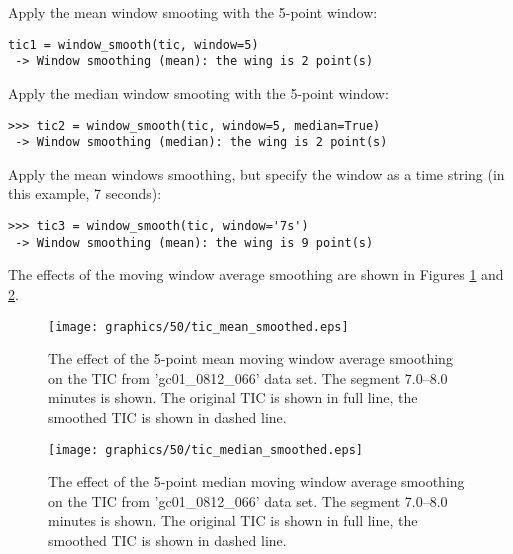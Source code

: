 Apply the mean window smooting with the 5-point window:

\begin{verbatim}
tic1 = window_smooth(tic, window=5)
 -> Window smoothing (mean): the wing is 2 point(s)
\end{verbatim}

Apply the median window smooting with the 5-point window:

\begin{verbatim}
>>> tic2 = window_smooth(tic, window=5, median=True)
 -> Window smoothing (median): the wing is 2 point(s)
\end{verbatim}

Apply the mean windows smoothing, but specify the window as
a time string (in this example, 7 seconds):

\begin{verbatim}
>>> tic3 = window_smooth(tic, window='7s')
 -> Window smoothing (mean): the wing is 9 point(s)
\end{verbatim}

The effects of the moving window average smoothing are shown in Figures
\ref{fig:smoothed-mean} and \ref{fig:smoothed-median}.

\begin{figure}[htp]
\begin{center}
\texttt{[image: graphics/50/tic\_mean\_smoothed.eps]}
\caption{The effect of the 5-point mean moving window average smoothing
on the TIC from 'gc01\_0812\_066' data set. The segment 7.0--8.0
minutes is shown. The original TIC is shown in full line, the smoothed
TIC is shown in dashed line.}
\label{fig:smoothed-mean}
\end{center}
\end{figure}

\begin{figure}[htp]
\begin{center}
\texttt{[image: graphics/50/tic\_median\_smoothed.eps]}
\caption{The effect of the 5-point median moving window average smoothing
on the TIC from 'gc01\_0812\_066' data set. The segment 7.0--8.0
minutes is shown. The original TIC is shown in full line, the smoothed
TIC is shown in dashed line.}
\label{fig:smoothed-median}
\end{center}
\end{figure}

